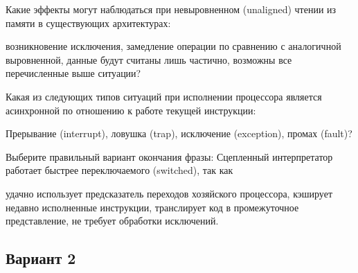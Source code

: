 \begin{questions}
\question[1] Какие эффекты могут наблюдаться при невыровненном (unaligned) чтении из памяти в существующих архитектурах:
\begin{choices}
    \correctchoice возникновение исключения,
    \correctchoice     замедление операции по сравнению с аналогичной выровненной,
    \choice данные будут считаны лишь частично,
    \choice  возможны все перечисленные выше ситуации?
\end{choices}

\question[3] Какая из следующих типов ситуаций при исполнении процессора является асинхронной по отношению к работе текущей инструкции:
\begin{choices}
    \correctchoice Прерывание (interrupt),
    \choice ловушка (trap),
    \choice исключение (exception),
    \choice промах (fault)?
\end{choices}

\question[3] Выберите правильный вариант окончания фразы: Сцепленный интерпретатор работает быстрее переключаемого (switched), так как
\begin{choices}
    \correctchoice удачно использует предсказатель переходов хозяйского процессора,
    \choice кэширует недавно исполненные инструкции,
    \choice транслирует код в промежуточное представление,
    \choice не требует обработки исключений.
\end{choices}

\end{questions}

\subsection*{Вариант 2}

